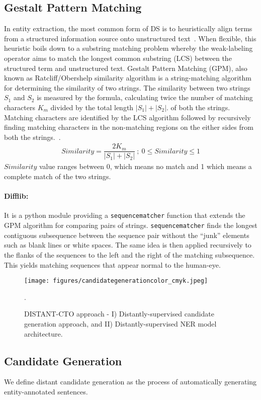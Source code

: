\documentclass[letterpaper]{article} %
\begin{document}
\subsection{Gestalt Pattern Matching}
\label{subsec_gsp}
%
In entity extraction, the most common form of DS is to heuristically align terms from a structured information source onto unstructured text~\cite{wen2019efficient}.
When flexible, this heuristic boils down to a substring matching problem whereby the weak-labeling operator aims to match the longest common substring (LCS) between the structured term and unstructured text.
Gestalt Pattern Matching (GPM), also known as Ratcliff/Obershelp similarity algorithm is a string-matching algorithm for determining the similarity of two strings.
The similarity between two strings $S_{1}$ and $S_{2}$ is measured by the formula, calculating twice the number of matching characters $K_{m}$ divided by the total length $|S_{1}| + |S_{2}|$.
of both the strings.
Matching characters are identified by the LCS algorithm followed by recursively finding matching characters in the non-matching regions on the either sides from both the strings.~\cite{ratcliff1988pattern}.
%
\begin{gather}
  Similarity = \dfrac{ 2 K_{m}}{|S_{1}| + |S_{2}|} \: ; \: 0 \leq	 Similarity \leq	 1
\end{gather}
%
$Similarity$ value ranges between 0, which means no match and 1 which means a complete match of the two strings.
%
\paragraph{Difflib: }
It is a python module providing a {\tt sequencematcher} function that extends the GPM algorithm for comparing pairs of strings.
{\tt sequencematcher} finds the longest contiguous subsequence between the sequence pair without the ``junk'' elements such as blank lines or white spaces.
The same idea is then applied recursively to the flanks of the sequences to the left and the right of the matching subsequence.
This yields matching sequences that appear normal to the human-eye.
%
\begin{figure*}[ht]
\centering
\texttt{[image: figures/candidategenerationcolor\_cmyk.jpeg]} 
\caption{DISTANT-CTO approach - I) Distantly-supervised candidate generation approach, and II) Distantly-supervised NER model architecture.}.
\label{method:approach}
\end{figure*}
%
\subsection{Candidate Generation}
\label{subsec:candgen}
%
We define distant candidate generation as the process of automatically generating entity-annotated sentences.
%
\end{document}
